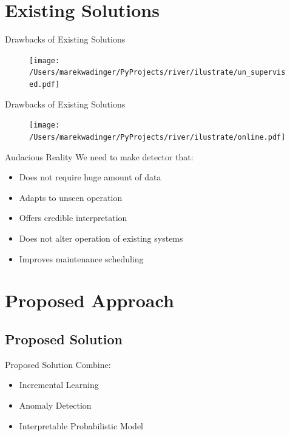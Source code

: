 \documentclass{beamer}
\begin{document}
\section{Existing Solutions}

\begin{frame}{Drawbacks of Existing Solutions}
    \begin{figure}[htpb]
        \begin{center}
            \texttt{[image: /Users/marekwadinger/PyProjects/river/ilustrate/un\_supervised.pdf]}
        \end{center}
    \end{figure}
\end{frame}

\begin{frame}{Drawbacks of Existing Solutions}
    \begin{figure}[htpb]
        \begin{center}
            \texttt{[image: /Users/marekwadinger/PyProjects/river/ilustrate/online.pdf]}
        \end{center}
    \end{figure}
\end{frame}

\begin{frame}{Audacious Reality}
    We need to make detector that:
    \begin{itemize}
        \item Does not require huge amount of data
        \item Adapts to unseen operation
        \item Offers credible interpretation
        \item Does not alter operation of existing systems
        \item Improves maintenance scheduling
    \end{itemize}
\end{frame}


\section{Proposed Approach}

\subsection{Proposed Solution}

\begin{frame}{Proposed Solution}
    Combine:
    \begin{itemize}
        \item Incremental Learning
        \item Anomaly Detection
        \item Interpretable Probabilistic Model
    \end{itemize}
\end{frame}
\end{document}
